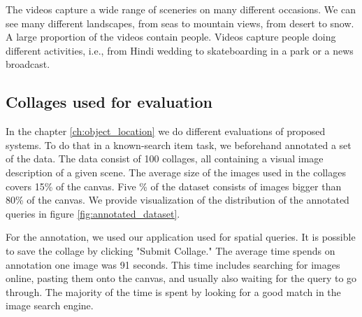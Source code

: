 The videos capture a wide range of sceneries on many different occasions. We can see many different landscapes, from seas to mountain views, from desert to snow. A large proportion of the videos contain people. Videos capture people doing different activities, i.e., from Hindi wedding to skateboarding in a park or a news broadcast.

\subsection{Collages used for evaluation}

In the chapter \ref{ch:object_location} we do different evaluations of proposed systems. To do that in a known-search item task, we beforehand annotated a set of the data. The data consist of 100 collages, all containing a visual image description of a given scene. The average size of the images used in the collages covers 15\% of the canvas. Five \% of the dataset consists of images bigger than 80\% of the canvas. We provide visualization of the distribution of the annotated queries in figure \ref{fig:annotated_dataset}.

For the annotation, we used our application used for spatial queries. It is possible to save the collage by clicking "Submit Collage." The average time spends on annotation one image was 91 seconds. This time includes searching for images online, pasting them onto the canvas, and usually also waiting for the query to go through. The majority of the time is spent by looking for a good match in the image search engine.

